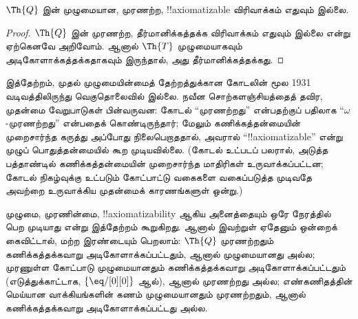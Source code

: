 \documentclass[../../../include/open-logic-section]{subfiles}
\begin{document}



\begin{thm}
$\Th{Q}$ இன் முழுமையான, முரணற்ற, !!{axiomatizable} விரிவாக்கம் எதுவும்
இல்லை.
\end{thm}

\begin{proof}
$\Th{Q}$ இன் முரணற்ற, தீர்மானிக்கத்தக்க விரிவாக்கம் எதுவும் இல்லை என்று
ஏற்கெனவே அறிவோம். ஆனால் $\Th{T}$ முழுமையாகவும்
அடிகோளாக்கத்தக்கதாகவும் இருந்தால், அது தீர்மானிக்கத்தக்கது.
\end{proof}

\begin{explain}
இத்தேற்றம், முதல் முழுமையின்மைத் தேற்றத்துக்கான கோடலின் மூல 1931
வடிவத்திலிருந்து வெகுதொலைவில் இல்லை. நவீன சொற்களஞ்சியத்தைத் தவிர,
முதன்மை வேறுபாடுகள் பின்வருவன: கோடல் “முரணற்றது” என்பதற்குப் பதிலாக
“$\omega$-முரணற்றது” என்பதைக் கொண்டிருந்தார்; மேலும் கணிக்கத்தன்மையின்
முறைசார்ந்த கருத்து அப்போது நிலைபெறாததால், அவரால்
“!!{axiomatizable}” என்று முழுப் பொதுத்தன்மையில் கூற முடியவில்லை.
(கோடல் உட்படப் பலரால், அடுத்த பத்தாண்டில் கணிக்கத்தன்மையின் முறைசார்ந்த
மாதிரிகள் உருவாக்கப்பட்டன; கோடல் நிகழ்வுக்கு உட்படும் கோட்பாட்டு வகைகளை
வகைப்படுத்த முடிவதே அவற்றை உருவாக்கிய முதன்மைக் காரணங்களுள் ஒன்று.)

முழுமை, முரணின்மை, !!{axiomatizability} ஆகிய அனைத்தையும் ஒரே நேரத்தில்
பெற முடியாது என்று இத்தேற்றம் கூறுகிறது. ஆனால் இவற்றுள் ஏதேனும் ஒன்றைக்
கைவிட்டால், மற்ற இரண்டையும் பெறலாம்: $\Th{Q}$ முரணற்றதும் கணிக்கத்தக்கவாறு
அடிகோளாக்கப்பட்டதும், ஆனால் முழுமையானது அல்ல; முரணுள்ள கோட்பாடு
முழுமையானதும் கணிக்கத்தக்கவாறு அடிகோளாக்கப்பட்டதும் (எடுத்துக்காட்டாக,
$\{ \eq/[0][0] \}$ ஆல்), ஆனால் முரணற்றது அல்ல; எண்கணிதத்தின் மெய்யான
வாக்கியங்களின் கணம் முழுமையானதும் முரணற்றதும், ஆனால் கணிக்கத்தக்கவாறு
அடிகோளாக்கப்பட்டது அல்ல.
\end{explain}
\end{document}

